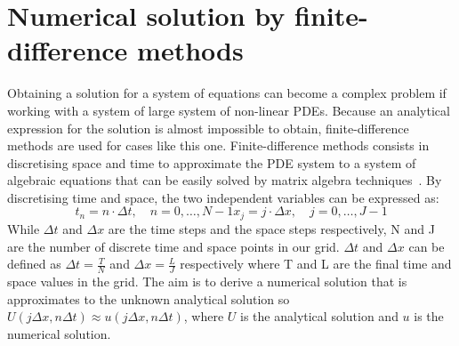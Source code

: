 \section{Numerical solution by finite-difference methods}\label{numerical_methods}
Obtaining a solution for a system of equations can become a complex problem if working with a system of large system of non-linear PDEs.
Because an analytical expression for the solution is almost impossible to obtain, finite-difference methods are used for cases like this one.
Finite-difference methods consists in discretising space and time to approximate the PDE system to a system of algebraic equations that can be easily solved by matrix algebra techniques~\parencite{Morton1994}.
By discretising time and space, the two independent variables can be expressed as:
\begin{subequations}
    \begin{equation}
        t_{n} = n \cdot \Delta t, \quad n=0,\dots,N-1
    \end{equation}
    \begin{equation}
        x_{j} = j \cdot \Delta x, \quad j=0, \dots,J-1
    \end{equation}
\end{subequations}
While $\Delta t$ and $\Delta x$ are the time steps and the space steps respectively, N and J are the number of discrete time and space points in our grid.
$\Delta t$ and $\Delta x$ can be defined as $ \Delta t = \frac{T}{N}$ and $\Delta x= \frac{L}{J}$ respectively where T and L are the final time and space values in the grid.
The aim is to derive a numerical solution that is approximates to the unknown analytical solution so $U(j\Delta x, n\Delta t)\approx u( j\Delta x, n\Delta t)$, where $U$ is the analytical solution and $u$ is the numerical solution.

